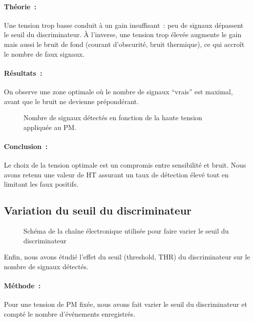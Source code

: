 \documentclass[a4paper,12pt,twoside]{article}
\begin{document}
\paragraph{Théorie :} Une tension trop basse conduit à un gain insuffisant : peu de signaux dépassent le seuil du discriminateur. À l’inverse, une tension trop élevée augmente le gain mais aussi le bruit de fond (courant d’obscurité, bruit thermique), ce qui accroît le nombre de faux signaux.

\paragraph{Résultats :} On observe une zone optimale où le nombre de signaux “vrais” est maximal, avant que le bruit ne devienne prépondérant.

\begin{figure}[H]
    \centering
    \caption{Nombre de signaux détectés en fonction de la haute tension appliquée au PM.}
\end{figure}

\paragraph{Conclusion :} Le choix de la tension optimale est un compromis entre sensibilité et bruit. Nous avons retenu une valeur de HT assurant un taux de détection élevé tout en limitant les faux positifs.

\subsection{Variation du seuil du discriminateur}

\begin{figure}[H]
  \centering
  
  \caption{Schéma de la chaîne électronique utilisée pour faire varier le seuil du discriminateur}
  \label{fig:variation_seuil}
\end{figure}

Enfin, nous avons étudié l’effet du seuil (threshold, THR) du discriminateur sur le nombre de signaux détectés.

\paragraph{Méthode :} Pour une tension de PM fixée, nous avons fait varier le seuil du discriminateur et compté le nombre d’événements enregistrés.
\end{document}
